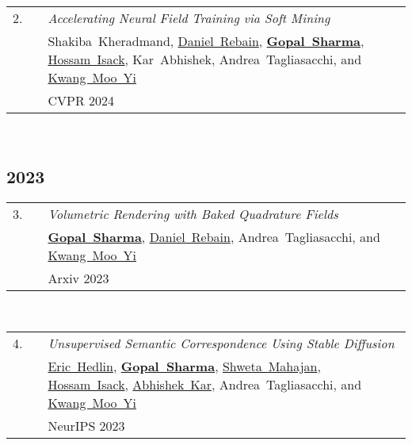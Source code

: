 \documentclass[11pt,letter,sans]{moderncv}
\begin{document}
  \begin{minipage}{\textwidth}
  \begin{tabular}[t]{p{8mm}p{1mm}>{\raggedright\arraybackslash}p{6.5in}}
   \hfill2.\hspace*{1mm} && \textit{Accelerating Neural Field Training via Soft Mining}  \\
   && \mbox{Shakiba Kheradmand}, \mbox{\href{}{Daniel Rebain}}, \mbox{\textbf{\href{hippogriff.github.io}{Gopal Sharma}}}, \mbox{\href{}{Hossam Isack}}, \mbox{Kar Abhishek}, \mbox{Andrea Tagliasacchi}, and \mbox{\href{}{Kwang Moo Yi}} \\
   && CVPR 2024  \\
  \end{tabular} \\[2mm]
  \end{minipage}

\subsection{2023}

\begin{minipage}{\textwidth}
\begin{tabular}[t]{p{8mm}p{1mm}>{\raggedright\arraybackslash}p{6.5in}}
 \hfill3.\hspace*{1mm} && \textit{Volumetric Rendering with Baked Quadrature Fields}  \\
 && \mbox{\textbf{\href{hippogriff.github.io}{Gopal Sharma}}}, \mbox{\href{}{Daniel Rebain}}, \mbox{Andrea Tagliasacchi}, and \mbox{\href{}{Kwang Moo Yi}} \\
 && Arxiv 2023  \\
\end{tabular} \\[2mm]
\end{minipage}

\begin{minipage}{\textwidth}
\begin{tabular}[t]{p{8mm}p{1mm}>{\raggedright\arraybackslash}p{6.5in}}
 \hfill4.\hspace*{1mm} && \textit{Unsupervised Semantic Correspondence Using Stable Diffusion}  \\
 && \mbox{\href{}{Eric Hedlin}}, \mbox{\textbf{\href{hippogriff.github.io}{Gopal Sharma}}}, \mbox{\href{}{Shweta Mahajan}}, \mbox{\href{}{Hossam Isack}}, \mbox{\href{}{Abhishek Kar}}, \mbox{Andrea Tagliasacchi}, and \mbox{\href{}{Kwang Moo Yi}} \\
 && NeurIPS 2023  \\
\end{tabular} \\[2mm]
\end{minipage}
\end{document}
